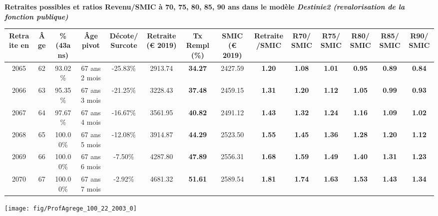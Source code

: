  \vspace{0.1cm} 
{\bf \noindent Retraites possibles et ratios Revenu/SMIC à 70, 75, 80, 85, 90 ans dans le modèle \emph{Destinie2 (revalorisation de la fonction publique)}}  
 
\begin{adjustbox}{max width=\textwidth} 
\begin{tabular}[htb]{|c|c||c|c|c||c|c||c|c||c|c|c|c|c|} 
\hline 
 Retraite en &  Âge &  \%(43ans) &  Âge pivot &  Décote/Surcote &  Retraite (\euro{} 2019) &  Tx Rempl(\%) &  SMIC (\euro{} 2019) &  Retraite/SMIC &  R70/SMIC &  R75/SMIC &  R80/SMIC &  R85/SMIC &  R90/SMIC \\ 
\hline \hline 
 2065 &  62 &  93.02\% &  67 ans 2 mois &  -25.83\% &  2913.74 &  {\bf 34.27} &  2427.59 &  {\bf 1.20} &  {\bf 1.08} &  {\bf 1.01} &  {\bf {\color{red} 0.95}} &  {\bf {\color{red} 0.89}} &  {\bf {\color{red} 0.84}} \\ 
\hline 
 2066 &  63 &  95.35\% &  67 ans 3 mois &  -21.25\% &  3228.43 &  {\bf 37.48} &  2459.15 &  {\bf 1.31} &  {\bf 1.20} &  {\bf 1.12} &  {\bf 1.05} &  {\bf {\color{red} 0.99}} &  {\bf {\color{red} 0.93}} \\ 
\hline 
 2067 &  64 &  97.67\% &  67 ans 4 mois &  -16.67\% &  3561.95 &  {\bf 40.82} &  2491.12 &  {\bf 1.43} &  {\bf 1.32} &  {\bf 1.24} &  {\bf 1.16} &  {\bf 1.09} &  {\bf 1.02} \\ 
\hline 
 2068 &  65 &  100.00\% &  67 ans 5 mois &  -12.08\% &  3914.87 &  {\bf 44.29} &  2523.50 &  {\bf 1.55} &  {\bf 1.45} &  {\bf 1.36} &  {\bf 1.28} &  {\bf 1.20} &  {\bf 1.12} \\ 
\hline 
 2069 &  66 &  100.00\% &  67 ans 6 mois &  -7.50\% &  4287.80 &  {\bf 47.89} &  2556.31 &  {\bf 1.68} &  {\bf 1.59} &  {\bf 1.49} &  {\bf 1.40} &  {\bf 1.31} &  {\bf 1.23} \\ 
\hline 
 2070 &  67 &  100.00\% &  67 ans 7 mois &  -2.92\% &  4681.32 &  {\bf 51.61} &  2589.54 &  {\bf 1.81} &  {\bf 1.74} &  {\bf 1.63} &  {\bf 1.53} &  {\bf 1.43} &  {\bf 1.34} \\ 
\hline 
\hline 
\end{tabular} 
\end{adjustbox} 
 
 \vspace{0.1cm} 

 {\hspace{-2.2cm}\texttt{[image: fig/ProfAgrege\_100\_22\_2003\_0]}} 

\newpage 
 
